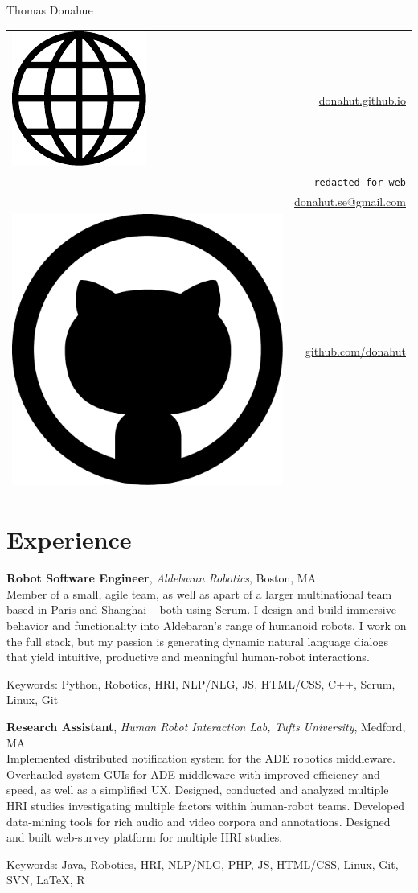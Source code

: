 \documentclass[10pt, letter]{article}
\newcommand*\globe{\includegraphics[height=1.6ex]{globe.pdf}}
\newcommand*\github{\includegraphics[height=2ex]{github.pdf}}
\newcommand{\years}[1]{\marginnote{\footnotesize #1}}
\newenvironment{desc*}{
  \begin{description}
    \setlength{\itemsep}{0.2pt}
    \setlength{\parskip}{-1pt}
    \setlength{\parsep}{0pt}
  }{
  \end{description}
}
\begin{document}
\begin{minipage}[t]{0.55\textwidth}
  {\Huge Thomas Donahue}
\end{minipage}
\begin{minipage}[t]{0.45\textwidth}
  \flushright 
  \begin{tabular}[h]{lr}
    \globe{}    & \href{http://donahut.github.io}{donahut.github.io}\\    
    \Phone{}    & \texttt{redacted for web}\\
    \Envelope{} & \href{mailto:donahut.se@gmail.com}{donahut.se@gmail.com}\\    
    \github{}   & \href{http://www.github.com/donahut}{github.com/donahut}
  \end{tabular}
\end{minipage}

\section*{Experience}
\years{Mar 2014--}
\textbf{Robot Software Engineer}, \textsl{Aldebaran Robotics}, Boston, MA\\
Member of a small, agile team, as well as apart of a larger
multinational team based in Paris and Shanghai -- both
using Scrum. I design and build immersive behavior and functionality
into Aldebaran's range of humanoid robots. I work on the full stack,
but my passion is generating dynamic natural language dialogs that
yield intuitive, productive and meaningful human-robot interactions.
\begin{desc*}
\item[Keywords:] Python, Robotics, HRI, NLP/NLG, JS, HTML/CSS, C++, Scrum,
  Linux, Git
\end{desc*}

\years{2012 - 2014} 
\textbf{Research Assistant}, 
\textsl{Human Robot Interaction Lab, Tufts University}, Medford, MA\\
Implemented distributed notification system for the ADE robotics
middleware. Overhauled system GUIs for ADE middleware with improved
efficiency and speed, as well as a simplified UX. Designed, conducted
and analyzed multiple HRI studies investigating multiple factors within
human-robot teams. Developed data-mining tools for rich audio and
video corpora and annotations. Designed and built web-survey platform
for multiple HRI studies.
\begin{desc*}
\item[Keywords:] Java, Robotics, HRI, NLP/NLG, PHP, JS, HTML/CSS, Linux, Git,
  SVN, \LaTeX, R
\end{desc*}
\end{document}
